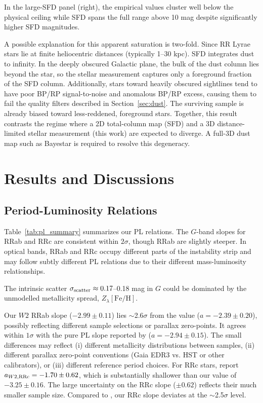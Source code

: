 \documentclass[10pt,preprint2]{aastex}
\begin{document}
In the large-SFD panel (right), the empirical values cluster well below the physical ceiling while SFD spans the full range above 10 mag despite significantly higher SFD magnitudes. 

A possible explanation for this apparent saturation is two-fold. Since RR Lyrae stars lie at finite heliocentric distances (typically 1--30 kpc). SFD integrates dust to infinity. In the deeply obscured Galactic plane, the bulk of the dust column lies beyond the star, so the stellar measurement captures only a foreground fraction of the SFD column. Additionally, stars toward heavily obscured sightlines tend to have poor BP/RP signal-to-noise and anomalous BP/RP excess, causing them to fail the quality filters described in Section~\ref{sec:dust}. The surviving sample is already biased toward less-reddened, foreground stars.  Together, this result contrasts the regime where a 2D total-column map (SFD) and a 3D distance-limited stellar measurement (this work) are expected to diverge. A full-3D dust map such as Bayestar \citep{Green2019} is required to resolve this degeneracy.

\section{Results and Discussions}
\label{sec:results}

\subsection{Period-Luminosity Relations}

Table~\ref{tab:pl_summary} summarizes our PL relations. The $G$-band slopes for RRab and RRc are consistent within $2\sigma$, though RRab are slightly steeper. In optical bands, RRab and RRc occupy different parts of the instability strip and may follow subtly different PL relations due to their different mass-luminosity relationships. 

The intrinsic scatter $\sigma_{\rm scatter} \approx 0.17$--0.18 mag in $G$ could be dominated by the unmodelled metallicity spread, $Z_\lambda [\mathrm{Fe/H}]$.

Our $W2$ RRab slope ($-2.99 \pm 0.11$) lies $\sim$2.6$\sigma$ from the \citet{KleinBloom2014} value ($a = -2.39 \pm 0.20$), possibly reflecting different sample selections or parallax zero-points. It agrees within $1\sigma$ with the pure PL slope reported by \citet{Dambis2014} ($a = -2.94 \pm 0.15$). The small differences may reflect (i) different metallicity distributions between samples, (ii) different parallax zero-point conventions (Gaia EDR3 vs. HST or other calibrators), or (iii) different reference period choices. For RRc stars, \citet{KleinBloom2014} report $a_{W2,\rm RRc} = -1.70 \pm 0.62$, which is substantially shallower than our value of $-3.25 \pm 0.16$. The large uncertainty on the \citet{KleinBloom2014} RRc slope ($\pm 0.62$) reflects their much smaller sample size. Compared to \citet{KleinBloom2014}, our RRc slope deviates at the $\sim$2.5$\sigma$ level.
\end{document}
